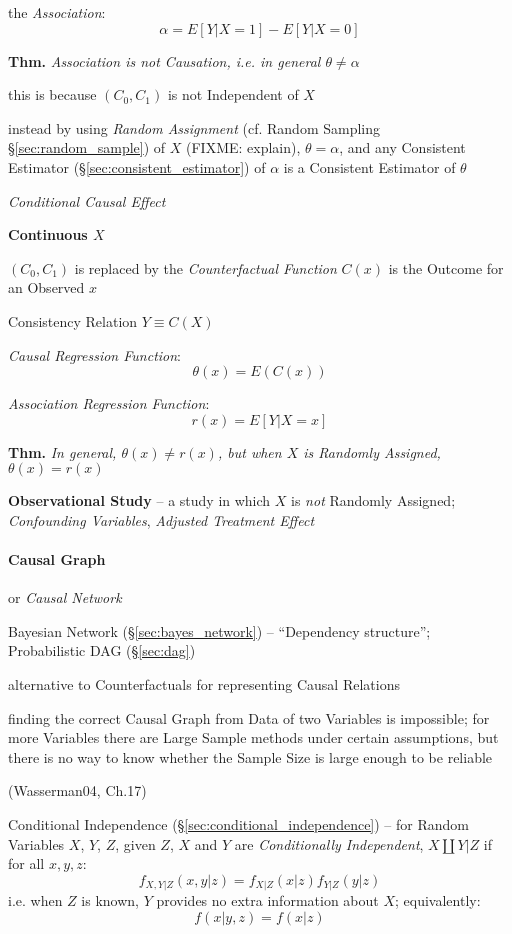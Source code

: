 the \emph{Association}:
\[
  \alpha = E[Y | X = 1] - E[Y | X = 0]
\]

\textbf{Thm.} \emph{Association is not Causation, i.e. in general
$\theta \neq \alpha$}

this is because $(C_0, C_1)$ is not Independent of $X$

instead by using \emph{Random Assignment} (cf. Random Sampling
\S\ref{sec:random_sample}) of $X$ (FIXME: explain), $\theta = \alpha$, and any
Consistent Estimator (\S\ref{sec:consistent_estimator}) of $\alpha$ is a
Consistent Estimator of $\theta$

\emph{Conditional Causal Effect}

\textbf{Continuous $X$}

$(C_0, C_1)$ is replaced by the \emph{Counterfactual Function} $C(x)$ is the
Outcome for an Observed $x$

Consistency Relation $Y \equiv C(X)$

\emph{Causal Regression Function}:
\[
  \theta(x) = E(C(x))
\]

\emph{Association Regression Function}:
\[
  r(x) = E[Y | X = x]
\]

\textbf{Thm.} \emph{In general, $\theta(x) \neq r(x)$, but when $X$ is Randomly
  Assigned, $\theta(x) = r(x)$}


\textbf{Observational Study} -- a study in which $X$ is \emph{not} Randomly
Assigned; \emph{Confounding Variables}, \emph{Adjusted Treatment Effect}



\paragraph{Causal Graph}\label{sec:causal_graph}\hfill

or \emph{Causal Network}

\fist Bayesian Network (\S\ref{sec:bayes_network}) -- ``Dependency structure'';
Probabilistic DAG (\S\ref{sec:dag})

alternative to Counterfactuals for representing Causal Relations

finding the correct Causal Graph from Data of two Variables is impossible; for
more Variables there are Large Sample methods under certain assumptions, but
there is no way to know whether the Sample Size is large enough to be reliable

(Wasserman04, Ch.17)

Conditional Independence (\S\ref{sec:conditional_independence}) -- for Random
Variables $X$, $Y$, $Z$, given $Z$, $X$ and $Y$ are \emph{Conditionally
  Independent}, $X \coprod Y | Z$ if for all $x,y,z$:
\[
  f_{X,Y|Z}(x,y|z) = f_{X|Z}(x|z) f_{Y|Z}(y|z)
\]
i.e. when $Z$ is known, $Y$ provides no extra information about $X$;
equivalently:
\[
  f(x|y, z) = f(x|z)
\]


